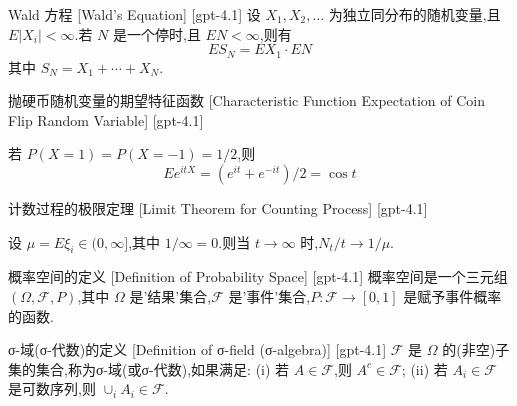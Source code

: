 \documentclass[UTF8]{ctexart}
\begin{document}
    
    
    \begin{thm}
        {Wald 方程}
        [Wald's Equation]
        [gpt-4.1]
        设 $X_{1}, X_{2}, \ldots$ 为独立同分布的随机变量,且 $E|X_{i}| < \infty$.若 $N$ 是一个停时,且 $E N < \infty$,则有
\[
E S_{N} = E X_{1} \cdot E N
\]
其中 $S_{N} = X_{1} + \cdots + X_{N}$.
    \end{thm}
    
    
    
    \begin{xmp}
        {抛硬币随机变量的期望特征函数}
        [Characteristic Function Expectation of Coin Flip Random Variable]
        [gpt-4.1]
        
若 $P(X = 1) = P(X = -1) = 1/2$,则
\[
E e^{i t X} = (e^{i t} + e^{-i t}) / 2 = \cos t
\]

    \end{xmp}
    
    
    
    \begin{thm}
        {计数过程的极限定理}
        [Limit Theorem for Counting Process]
        [gpt-4.1]
        
设 $\mu = E \xi_{i} \in (0, \infty]$,其中 $1 / \infty = 0$.则当 $t \to \infty$ 时,$N_{t} / t \to 1 / \mu$.

    \end{thm}
    
    
    
    \begin{dfn}
        {概率空间的定义}
        [Definition of Probability Space]
        [gpt-4.1]
        概率空间是一个三元组 $(\Omega, \mathcal{F}, P)$,其中 $\Omega$ 是'结果'集合,$\mathcal{F}$ 是'事件'集合,$P: \mathcal{F} \to [0, 1]$ 是赋予事件概率的函数.
    \end{dfn}
    
    
    
    \begin{dfn}
        {σ-域(σ-代数)的定义}
        [Definition of σ-field (σ-algebra)]
        [gpt-4.1]
        $\mathcal{F}$ 是 $\Omega$ 的(非空)子集的集合,称为σ-域(或σ-代数),如果满足:
(i) 若 $A \in \mathcal{F}$,则 $A^c \in \mathcal{F}$;
(ii) 若 $A_i \in \mathcal{F}$ 是可数序列,则 $\cup_i A_i \in \mathcal{F}$.
    \end{dfn}
    
\end{document}
